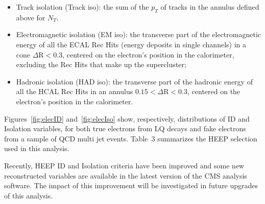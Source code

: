 \begin{itemize}
%
\item Track isolation (Track iso): the sum of the $p_{T}$ of tracks in the annulus defined above for $N_T$.
%
%
\item Electromagnetic isolation (EM iso): 
the transverse part of the electromagnetic energy 
of all the ECAL Rec Hits (energy deposits in single channels)
in a cone $\Delta\mbox{R} < 0.3$, 
centered on the electron's position in the calorimeter, excluding the Rec Hits that make up the supercluster;
%
\item Hadronic isolation (HAD iso): 
the transverse part of the hadronic energy of all the HCAL Rec Hits in an annulus
$0.15 < \Delta\mbox{R} < 0.3$, centered on the electron's position in the calorimeter. 
%
\end{itemize}

Figures~\ref{fig:elecID} and~\ref{fig:elecIso} show, respectively, distributions of ID and Isolation variables, 
for both true electrons from LQ decays and fake electrons from a sample of QCD multi jet events. 
Table~3 
summarizes the HEEP selection used in this analysis. 

Recently, HEEP ID and Isolation criteria have been improved
and some new reconstructed variables are available in the latest version 
of the CMS analysis software. 
The impact of this improvement will be investigated in 
future upgrades of this analysis. 




